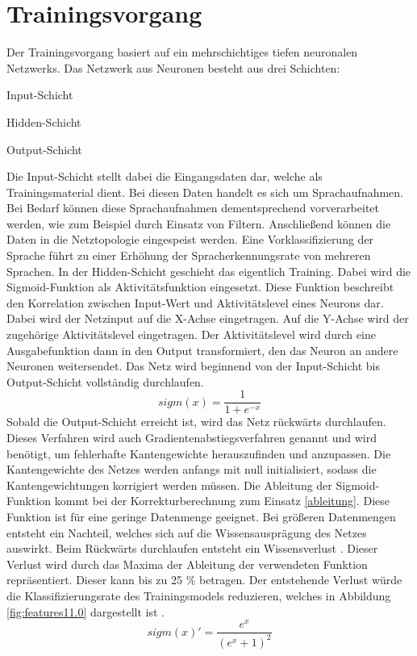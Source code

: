 \section{Trainingsvorgang}

Der Trainingsvorgang basiert auf ein mehrschichtiges tiefen neuronalen Netzwerks. Das Netzwerk aus Neuronen besteht aus drei Schichten:
\begin{description}
	\item Input-Schicht
	\item Hidden-Schicht 
	\item Output-Schicht
\end{description}
Die Input-Schicht stellt dabei die Eingangsdaten dar, welche als Trainingsmaterial dient. Bei diesen Daten handelt es sich um Sprachaufnahmen. Bei Bedarf können diese Sprachaufnahmen dementsprechend vorverarbeitet werden, wie zum Beispiel durch Einsatz von Filtern. Anschließend können die Daten in die Netztopologie eingespeist werden. Eine Vorklassifizierung der Sprache führt zu einer Erhöhung der Spracherkennungsrate von mehreren Sprachen. In der Hidden-Schicht geschieht das eigentlich Training. Dabei wird die Sigmoid-Funktion als Aktivitätsfunktion eingesetzt. Diese Funktion beschreibt den Korrelation zwischen Input-Wert und  Aktivitätslevel eines Neurons dar. Dabei wird der Netzinput auf die X-Achse eingetragen. Auf die Y-Achse wird der zugehörige Aktivitätslevel eingetragen. Der Aktivitätslevel wird durch eine Ausgabefunktion dann in den Output transformiert, den das Neuron an andere Neuronen weitersendet\cite{Neuronal31:online}. Das Netz wird beginnend von der Input-Schicht bis Output-Schicht vollständig durchlaufen. 
\begin{equation}
sigm(x)=\frac{ 1 }{1+e^{-x}  }
\label{normal}
\end{equation}
Sobald die Output-Schicht erreicht ist, wird das Netz rückwärts durchlaufen. Dieses Verfahren wird auch Gradientenabstiegsverfahren genannt und wird benötigt, um fehlerhafte Kantengewichte herauszufinden und anzupassen. Die Kantengewichte des Netzes werden anfangs mit null initialisiert, sodass die Kantengewichtungen korrigiert werden müssen. Die Ableitung der Sigmoid-Funktion kommt bei der Korrekturberechnung zum Einsatz \ref{ableitung}. Diese Funktion ist für eine geringe Datenmenge geeignet. Bei größeren Datenmengen entsteht ein Nachteil, welches sich auf die Wissensausprägung des Netzes auswirkt. Beim Rückwärts durchlaufen entsteht ein Wissensverlust \cite{bishop.2006}. Dieser Verlust wird durch das Maxima der Ableitung der verwendeten Funktion repräsentiert. Dieser kann bis zu 25 \% betragen. Der entstehende Verlust würde die Klassifizierungsrate des Trainingsmodels reduzieren, welches in Abbildung \ref{fig:features11.0} dargestellt ist \cite{Kulbear.2017}.
\begin{equation}
sigm(x)'= \frac{ e^{x} }{(e^{x} +1)^2  }
\label{ableitung}
\end{equation}

